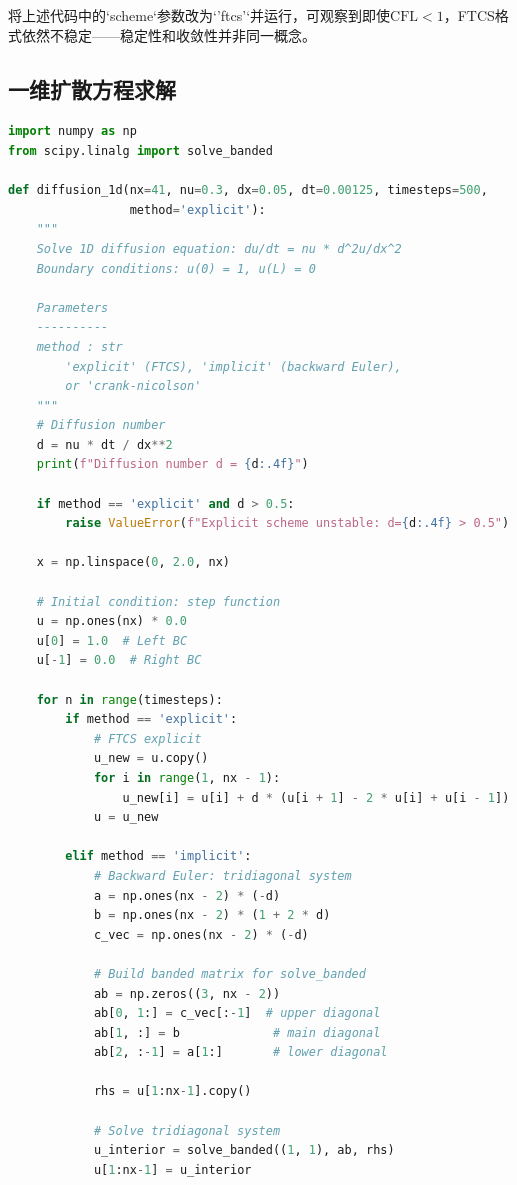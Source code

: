 \begin{remark}
将上述代码中的`scheme`参数改为`'ftcs'`并运行，可观察到即使$\text{CFL}<1$，FTCS格式依然不稳定——稳定性和收敛性并非同一概念。
\end{remark}

\subsection{一维扩散方程求解}

\begin{lstlisting}[language=Python]
import numpy as np
from scipy.linalg import solve_banded

def diffusion_1d(nx=41, nu=0.3, dx=0.05, dt=0.00125, timesteps=500,
                 method='explicit'):
    """
    Solve 1D diffusion equation: du/dt = nu * d^2u/dx^2
    Boundary conditions: u(0) = 1, u(L) = 0
    
    Parameters
    ----------
    method : str
        'explicit' (FTCS), 'implicit' (backward Euler), 
        or 'crank-nicolson'
    """
    # Diffusion number
    d = nu * dt / dx**2
    print(f"Diffusion number d = {d:.4f}")
    
    if method == 'explicit' and d > 0.5:
        raise ValueError(f"Explicit scheme unstable: d={d:.4f} > 0.5")
    
    x = np.linspace(0, 2.0, nx)
    
    # Initial condition: step function
    u = np.ones(nx) * 0.0
    u[0] = 1.0  # Left BC
    u[-1] = 0.0  # Right BC
    
    for n in range(timesteps):
        if method == 'explicit':
            # FTCS explicit
            u_new = u.copy()
            for i in range(1, nx - 1):
                u_new[i] = u[i] + d * (u[i + 1] - 2 * u[i] + u[i - 1])
            u = u_new
        
        elif method == 'implicit':
            # Backward Euler: tridiagonal system
            a = np.ones(nx - 2) * (-d)
            b = np.ones(nx - 2) * (1 + 2 * d)
            c_vec = np.ones(nx - 2) * (-d)
            
            # Build banded matrix for solve_banded
            ab = np.zeros((3, nx - 2))
            ab[0, 1:] = c_vec[:-1]  # upper diagonal
            ab[1, :] = b             # main diagonal
            ab[2, :-1] = a[1:]       # lower diagonal
            
            rhs = u[1:nx-1].copy()
            
            # Solve tridiagonal system
            u_interior = solve_banded((1, 1), ab, rhs)
            u[1:nx-1] = u_interior
        

\end{lstlisting}
